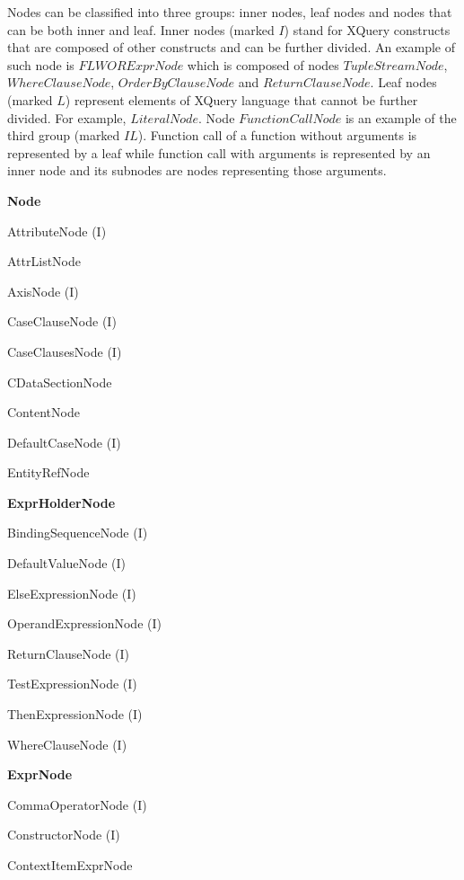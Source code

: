 Nodes can be classified into three groups: inner nodes, leaf nodes and nodes that can be both inner and leaf. Inner nodes (marked $I$) stand for XQuery constructs that are composed of other constructs and can be further divided. An example of such node is $FLWORExprNode$ which is composed of nodes $TupleStreamNode$, $WhereClauseNode$, $OrderByClauseNode$ and $ReturnClauseNode$. Leaf nodes (marked $L$) represent elements of XQuery language that cannot be further divided. For example, $LiteralNode$. Node $FunctionCallNode$ is an example of the third group (marked $IL$). Function call of a function without arguments is represented by a leaf while function call with arguments is represented by an inner node and its subnodes are nodes representing those arguments.

\begin{description}
\item \textbf{Node}
\begin{description}
\item AttributeNode (I)
\item AttrListNode
\item AxisNode (I)
\item CaseClauseNode (I)
\item CaseClausesNode (I)
\item CDataSectionNode
\item ContentNode
\item DefaultCaseNode (I)
\item EntityRefNode
\item \textbf{ExprHolderNode}
  \begin{description}
  \item BindingSequenceNode (I)
  \item DefaultValueNode (I)
  \item ElseExpressionNode (I)
  \item OperandExpressionNode (I)
  \item ReturnClauseNode (I)
  \item TestExpressionNode (I)
  \item ThenExpressionNode (I)
  \item WhereClauseNode (I)
  \end{description}
\item \textbf{ExprNode}
  \begin{description}
  \item CommaOperatorNode (I)
  \item ConstructorNode (I)
  \item ContextItemExprNode

\end{description}
\end{description}
\end{description}
